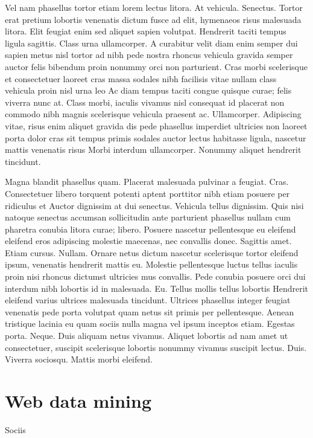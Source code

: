Vel nam phasellus tortor etiam lorem lectus litora. At vehicula. Senectus. Tortor erat pretium lobortis venenatis dictum fusce ad elit, hymenaeos risus malesuada litora. Elit feugiat enim sed aliquet sapien volutpat. Hendrerit taciti tempus ligula sagittis. Class urna ullamcorper. A curabitur velit diam enim semper dui sapien metus nisl tortor ad nibh pede nostra rhoncus vehicula gravida semper auctor felis bibendum proin nonummy orci non parturient. Cras morbi scelerisque et consectetuer laoreet cras massa sodales nibh facilisis vitae nullam class vehicula proin nisl urna leo Ac diam tempus taciti congue quisque curae; felis viverra nunc at. Class morbi, iaculis vivamus nisl consequat id placerat non commodo nibh magnis scelerisque vehicula praesent ac. Ullamcorper. Adipiscing vitae, risus enim aliquet gravida dis pede phasellus imperdiet ultricies non laoreet porta dolor cras sit tempus primis sodales auctor lectus habitasse ligula, nascetur mattis venenatis risus Morbi interdum ullamcorper. Nonummy aliquet hendrerit tincidunt.

Magna blandit phasellus quam. Placerat malesuada pulvinar a feugiat. Cras. Consectetuer libero torquent potenti aptent porttitor nibh etiam posuere per ridiculus et Auctor dignissim at dui senectus. Vehicula tellus dignissim. Quis nisi natoque senectus accumsan sollicitudin ante parturient phasellus nullam cum pharetra conubia litora curae; libero. Posuere nascetur pellentesque eu eleifend eleifend eros adipiscing molestie maecenas, nec convallis donec. Sagittis amet. Etiam cursus. Nullam. Ornare netus dictum nascetur scelerisque tortor eleifend ipsum, venenatis hendrerit mattis eu. Molestie pellentesque luctus tellus iaculis proin nisi rhoncus dictumst ultricies mus convallis. Pede conubia posuere orci dui interdum nibh lobortis id in malesuada. Eu. Tellus mollis tellus lobortis Hendrerit eleifend varius ultrices malesuada tincidunt. Ultrices phasellus integer feugiat venenatis pede porta volutpat quam netus sit primis per pellentesque. Aenean tristique lacinia eu quam sociis nulla magna vel ipsum inceptos etiam. Egestas porta. Neque. Duis aliquam netus vivamus. Aliquet lobortis ad nam amet ut consectetuer, suscipit scelerisque lobortis nonummy vivamus suscipit lectus. Duis. Viverra sociosqu. Mattis morbi eleifend.

\section{Web data mining}

Sociis

